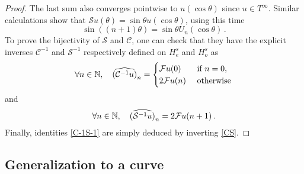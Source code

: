 \documentclass[a4paper]{article}
\begin{document}
\begin{proof}
	The last sum also converges pointwise to $u(\cos\theta)$ since $u \in T^\infty$. Similar calculations show that $\mathcal{S}u(\theta) = \sin\theta u(\cos\theta)$, using this time \[\sin((n+1)\theta) = \sin\theta U_n(\cos\theta)\,.\] 
	To prove the bijectivity of $\mathcal{S}$ and $\mathcal{C}$, one can check that they have the  explicit inverses $\mathcal{C}^{-1}$ and $\mathcal{S}^{-1}$ respectively defined on $H^s_e$ and $H^s_o$ as
	\[\forall n \in \mathbb{N}, \quad \widehat{(\mathcal{C}^{-1}u)}_n = \begin{cases}
	\mathcal{F}u(0) & \text{ if } n = 0,\\
	2\mathcal{F}u(n) & \text{ otherwise}	\end{cases}\,\]
	and
	\[\forall n \in \mathbb{N}, \quad \widehat{(\mathcal{S}^{-1}u)}_n = 2\mathcal{F}u(n+1)\,.\]
	Finally, identities \eqref{C-1S-1} are simply deduced by inverting \eqref{CS}. 
\end{proof}

	
\subsection{Generalization to a curve}

\label{TsUs(Gamma)}
\end{document}
